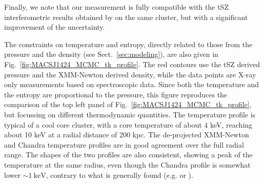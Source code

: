 \documentclass[twocolumn,traditabstract]{aa}
\begin{document}
Finally, we note that our measurement is fully compatible with the tSZ interferometric results obtained by \cite{bonamente2012} on the same cluster, but with a significant improvement of the uncertainty.

The constraints on temperature and entropy, directly related to those from the pressure and the density (see Sect.~\ref{sec:modeling}), are also given in Fig.~\ref{fig:MACSJ1424_MCMC_tk_profile}. The red contours use the tSZ derived pressure and the XMM-Newton derived density, while the data points are X-ray only  measurements based on spectroscopic data. Since both the temperature and the entropy are proportional to the pressure, this figure reproduces the comparison of the top left panel of Fig.~\ref{fig:MACSJ1424_MCMC_tk_profile}, but focussing on different thermodynamic quantities. The temperature profile is typical of a cool core cluster, with a core temperature of about 4 keV, reaching about 10 keV at a radial distance of 200 kpc. The de-projected XMM-Newton and Chandra temperature profiles are in good agreement over the full radial range. The shapes of the two profiles are also consistent, showing a peak of the temperature at the same radius, even though the Chandra profile is somewhat lower $\sim \SI{1}{\kilo\electronvolt}$, contrary to what is generally found (e.g. \citealt{mahdavi2013} or \citealt{martino2014}).
\end{document}
